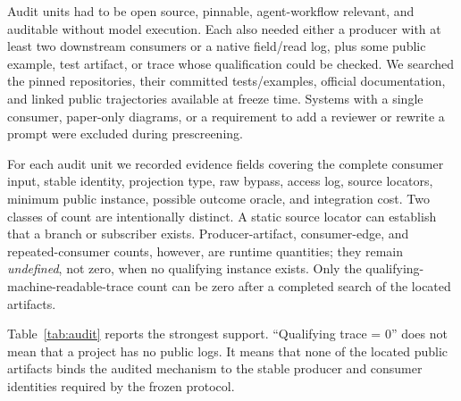 \documentclass[letterpaper]{article} %
\begin{document}
Audit units had to be open source, pinnable, agent-workflow relevant, and
auditable without model execution. Each also needed either a producer with at
least two downstream consumers or a native field/read log, plus some public
example, test artifact, or trace whose qualification could be checked. We
searched the pinned repositories, their committed tests/examples, official
documentation, and linked public trajectories available at freeze time.
Systems with a single consumer, paper-only diagrams, or a requirement to add a
reviewer or rewrite a prompt were excluded during prescreening.

For each audit unit we recorded evidence fields covering the complete consumer
input, stable identity, projection type, raw bypass, access log, source
locators, minimum public instance, possible outcome oracle, and integration
cost. Two classes of count are intentionally distinct. A static source locator
can establish that a branch or subscriber exists. Producer-artifact,
consumer-edge, and repeated-consumer counts, however, are runtime quantities;
they remain \emph{undefined}, not zero, when no qualifying instance exists.
Only the qualifying-machine-readable-trace count can be zero after a completed
search of the located artifacts.

Table~\ref{tab:audit} reports the strongest support. ``Qualifying trace = 0''
does not mean that a project has no public logs. It means that none of the
located public artifacts binds the audited mechanism to the stable producer
and consumer identities required by the frozen protocol.
\end{document}
